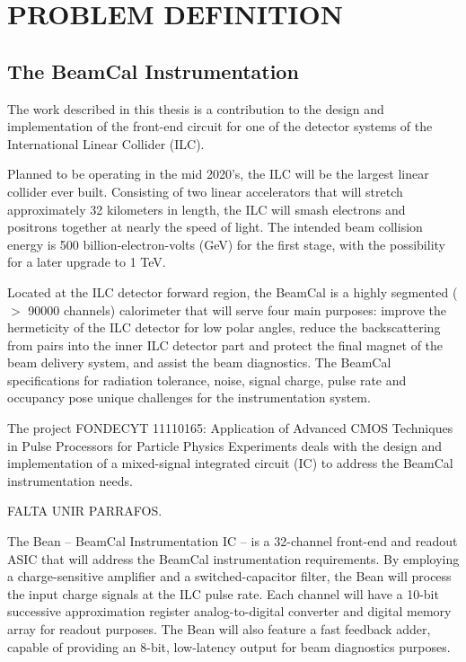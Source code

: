 \chapter{PROBLEM DEFINITION}
\label{chapter:problem}
\section{The BeamCal Instrumentation }

The work described in this thesis is a contribution to the design and implementation of the front-end circuit for one of the detector systems of the International Linear Collider (ILC).

Planned to be operating in the mid 2020’s, the ILC will be the largest linear collider ever built. Consisting of two linear accelerators that will stretch approximately 32 kilometers in length, the ILC will smash electrons and positrons together at nearly the speed of light. The intended beam collision energy is 500 billion-electron-volts (GeV) for the first stage, with the possibility for a later upgrade to 1 TeV. 
 
Located at the ILC detector forward region, the BeamCal is a highly segmented ($>$ 90000 channels) calorimeter that will serve four main purposes: improve the hermeticity of the ILC detector for low polar angles, reduce the backscattering from pairs into the inner ILC detector part and protect the final magnet of the beam delivery system, and assist the beam diagnostics. The BeamCal specifications for radiation tolerance, noise, signal charge, pulse rate and occupancy pose unique challenges for the instrumentation system.

The project FONDECYT 11110165: Application of Advanced CMOS Techniques in Pulse Processors for Particle Physics Experiments deals with the design and implementation of a mixed-signal integrated circuit (IC) to address the BeamCal instrumentation needs.

FALTA UNIR PARRAFOS.

The Bean – BeamCal Instrumentation IC – is a 32-channel front-end and readout ASIC that will address the BeamCal instrumentation requirements. By employing a charge-sensitive amplifier and a switched-capacitor filter, the Bean will process the input charge signals at the ILC pulse rate. Each channel will have a 10-bit successive approximation register analog-to-digital converter and digital memory array for readout purposes. The Bean will also feature a fast feedback adder, capable of providing an 8-bit, low-latency output for beam diagnostics purposes.

